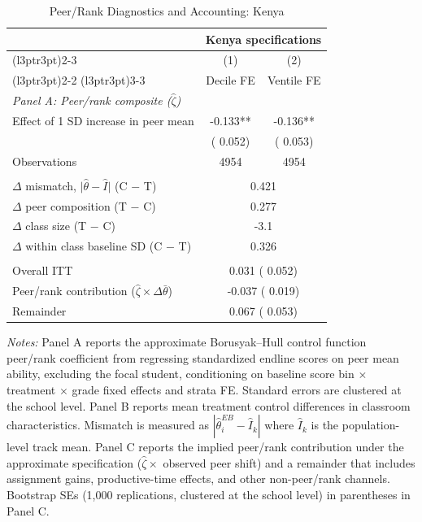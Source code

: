 \begin{table}[H]
\centering
\caption{Peer/Rank Diagnostics and Accounting: Kenya}
\label{tab:suffstat}
\begin{threeparttable}
\begin{tabular}[t]{lcc}
\toprule
\multicolumn{1}{c}{ } & \multicolumn{2}{c}{Kenya specifications} \\
\cmidrule(l{3pt}r{3pt}){2-3}
\multicolumn{1}{c}{ } & \multicolumn{1}{c}{(1)} & \multicolumn{1}{c}{(2)} \\
\cmidrule(l{3pt}r{3pt}){2-2} \cmidrule(l{3pt}r{3pt}){3-3}
 & Decile FE & Ventile FE \\
\midrule
\multicolumn{3}{l}{\textit{Panel A: Peer/rank composite ($\hat{\zeta}$)}} \\
Effect of 1 SD increase in peer mean &  -0.133** &  -0.136** \\
 & (  0.052) & (  0.053) \\
Observations & 4954 & 4954 \\
\addlinespace
\multicolumn{3}{l}{\textit{Panel B: Treatment-induced classroom shifts}} \\
$\Delta$ mismatch, $\lvert\hat{\theta} - \hat{I}\rvert$ (C $-$ T) & \multicolumn{2}{c}{  0.421} \\
$\Delta$ peer composition (T $-$ C) & \multicolumn{2}{c}{  0.277} \\
$\Delta$ class size (T $-$ C) & \multicolumn{2}{c}{   -3.1} \\
$\Delta$ within class baseline SD (C $-$ T) & \multicolumn{2}{c}{  0.326} \\
\addlinespace
\multicolumn{3}{l}{\textit{Panel C: Accounting decomposition}} \\
Overall ITT & \multicolumn{2}{c}{  0.031 (  0.052)} \\
Peer/rank contribution ($\hat{\zeta} \times \Delta\bar{\theta}$) & \multicolumn{2}{c}{ -0.037 (  0.019)} \\
Remainder & \multicolumn{2}{c}{  0.067 (  0.053)} \\
\bottomrule
\end{tabular}
\begin{tablenotes}
\footnotesize
\item \textit{Notes:} Panel A reports the approximate Borusyak--Hull control function peer/rank coefficient from regressing standardized endline scores on peer mean ability, excluding the focal student, conditioning on baseline score bin $\times$ treatment $\times$ grade fixed effects and strata FE\@. Standard errors are clustered at the school level. Panel B reports mean treatment control differences in classroom characteristics. Mismatch is measured as $|\hat{\theta}^{EB}_i - \hat{I}_k|$ where $\hat{I}_k$ is the population-level track mean. Panel C reports the implied peer/rank contribution under the approximate specification ($\hat{\zeta} \times$ observed peer shift) and a remainder that includes assignment gains, productive-time effects, and other non-peer/rank channels. Bootstrap SEs (1,000 replications, clustered at the school level) in parentheses in Panel C.
\end{tablenotes}
\end{threeparttable}
\end{table}
